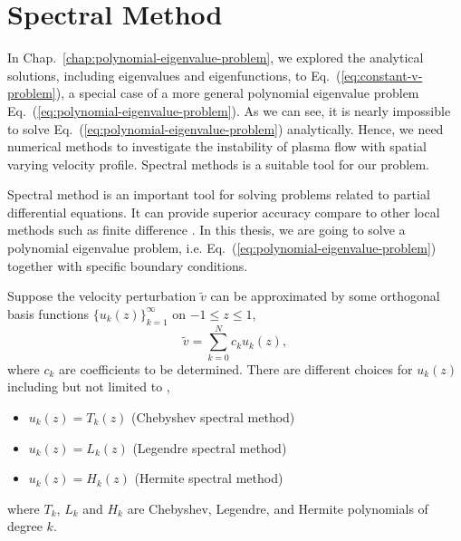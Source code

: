 \chapter{Spectral Method} \label{chap:spectral-method}
In Chap.~\ref{chap:polynomial-eigenvalue-problem}, we explored the analytical solutions, including eigenvalues and eigenfunctions, to Eq.~(\ref{eq:constant-v-problem}), a special case of a more general polynomial eigenvalue problem Eq.~(\ref{eq:polynomial-eigenvalue-problem}). As we can see, it is nearly impossible to solve Eq.~(\ref{eq:polynomial-eigenvalue-problem}) analytically. Hence, we need numerical methods to investigate the instability of plasma flow with spatial varying velocity profile. Spectral methods is a suitable tool for our problem.

Spectral method is an important tool for solving problems related to partial differential equations. It can provide superior accuracy compare to other local methods such as finite difference \cite{shen_tang_etal_spectral_2011}. In this thesis, we are going to solve a polynomial eigenvalue problem, i.e. Eq.~(\ref{eq:polynomial-eigenvalue-problem}) together with specific boundary conditions.

Suppose the velocity perturbation $\tilde{v}$ can be approximated by some orthogonal basis functions $\{u_k(z)\}_{k=1}^{\infty}$ on $-1\leq z\leq 1$,
\begin{equation}
	\tilde{v} = \sum_{k=0}^{N} c_ku_k(z),
\end{equation}
where $c_k$ are coefficients to be determined. There are different choices for $u_k(z)$ including but not limited to \cite{shen_tang_etal_spectral_2011},
\begin{itemize}
	\item $u_k(z)=T_k(z)$ (Chebyshev spectral method)
	\item $u_k(z)=L_k(z)$ (Legendre spectral method)
	\item $u_k(z)=H_k(z)$ (Hermite spectral method)
\end{itemize}
where $T_k$, $L_k$ and $H_k$ are Chebyshev, Legendre, and Hermite polynomials of degree $k$.

